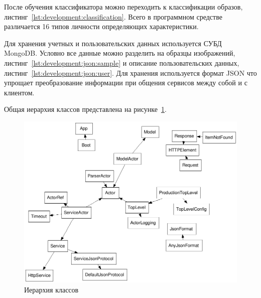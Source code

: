 После обучения классификатора можно переходить к классификации образов, листинг~\ref{lst:development:classification}. Всего в программном средстве различается 16 типов личности определяющих характеристики.



Для хранения учетных и пользовательских данных используется СУБД MongoDB. Условно все данные можно разделить на образцы изображений, листинг~\ref{lst:development:json:sample} и описание пользовательских данных, листинг~\ref{lst:development:json:user}. Для хранения используется формат JSON что упрощает преобразование информации при общения сервисов между собой и с клиентом. 





Общая иерархия классов представлена на рисунке~\ref{fig:develoipment:class_fdp}.
\begin{figure}[ht]
    \centering
    \label{fig:develoipment:class_fdp}
    \includegraphics[width=1\textwidth]{figures/classes-fdp.png}
    \caption{Иерархия классов}
\end{figure}

